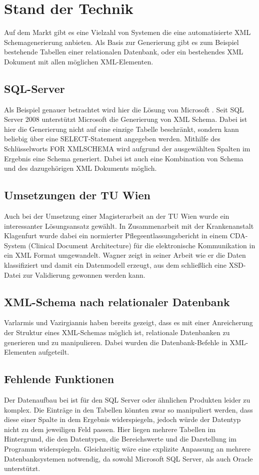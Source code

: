 \chapter{Stand der Technik}
\label{cha:technikstand}
Auf dem Markt gibt es eine Vielzahl von Systemen die eine automatisierte XML Schemagenerierung anbieten.
Als Basis zur Generierung gibt es zum Beispiel bestehende Tabellen einer relationalen Datenbank, oder ein bestehendes XML Dokument mit allen möglichen XML-Elementen. 


\section{SQL-Server}
Als Beispiel genauer betrachtet wird hier die Lösung von Microsoft \cite{SqlServer}. Seit SQL Server 2008 unterstützt Microsoft die Generierung von XML Schema. Dabei ist hier die Generierung nicht auf eine einzige Tabelle beschränkt, sondern kann beliebig über eine SELECT-Statement angegeben werden. 
Mithilfe des Schlüsselworts FOR XMLSCHEMA wird aufgrund der ausgewählten Spalten im Ergebnis eine Schema generiert.
Dabei ist auch eine Kombination von Schema und des dazugehörigen XML Dokuments möglich.

\section{Umsetzungen der TU Wien}
Auch bei der Umsetzung einer Magisterarbeit an der TU Wien wurde ein interessanter Lösungsansatz gewählt.
In Zusammenarbeit mit der Krankenanstalt Klagenfurt wurde dabei ein normierter Pflegeentlassungsbericht in einem CDA-System (Clinical Document Architecture) für die elektronische Kommunikation in ein XML Format umgewandelt.
Wagner zeigt in seiner Arbeit \cite{Wagner2007} wie er die Daten klassifiziert und damit ein Datenmodell erzeugt, aus dem schließlich eine XSD-Datei zur Validierung gewonnen werden kann.

\section{XML-Schema nach relationaler Datenbank}
Varlarmis und Vazirgiannis \cite{Varlamis2001BridgingXA} haben bereits gezeigt, dass es mit einer Anreicherung der Struktur eines XML-Schemas möglich ist, relationale Datenbanken zu generieren und zu manipulieren. Dabei wurden die Datenbank-Befehle in XML-Elementen aufgeteilt. 

\section{Fehlende Funktionen}
Der Datenaufbau bei \BMD ist für den SQL Server oder ähnlichen Produkten leider zu komplex.
Die Einträge in den Tabellen könnten zwar so manipuliert werden, dass diese einer Spalte in dem Ergebnis widerspiegeln, jedoch würde der Datentyp nicht zu dem jeweiligen Feld passen. Hier liegen mehrere Tabellen im Hintergrund, die den Datentypen, die Bereichswerte und die Darstellung im Programm widerspiegeln. 
Gleichzeitig wäre eine explizite Anpassung an mehrere Datenbanksystemen notwendig, da \BMD sowohl Microsoft SQL Server, als auch Oracle unterstützt.
